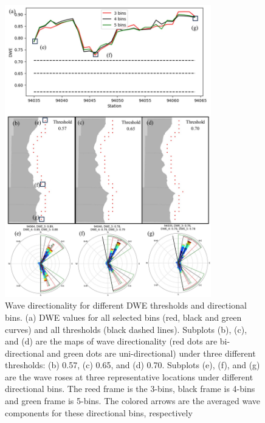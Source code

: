 \begin{figure}[htbp]
  \centering
  \includegraphics[width=0.8\textwidth]{chapter3/resources/figure3-9.jpg}
  \caption{Wave directionality for different DWE thresholds and directional bins. (a) DWE values for all selected bins (red, black and green curves) and all thresholds (black dashed lines). Subplots (b), (c), and (d) are the maps of wave directionality (red dots are bi-directional and green dots are uni-directional) under three different thresholds: (b) 0.57, (c) 0.65, and (d) 0.70. Subplots (e), (f), and (g) are the wave roses at three representative locations under different directional bins. The reed frame is the 3-bins, black frame is 4-bins and green frame is 5-bins. The colored arrows are the averaged wave components for these directional bins, respectively}
  \label{fig:fig3.9}
\end{figure}

